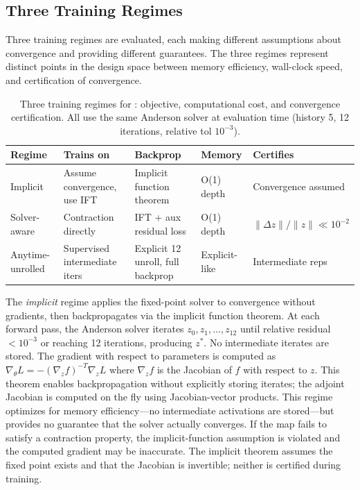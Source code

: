 \subsection*{Three Training Regimes}

Three training regimes are evaluated, each making different assumptions about convergence and providing different guarantees. The three regimes represent distinct points in the design space between memory efficiency, wall-clock speed, and certification of convergence.

\begin{table}[h]
\centering
\small
\caption{Three training regimes for \EqLM{}: objective, computational cost, and convergence certification. All use the same Anderson solver at evaluation time (history 5, 12 iterations, relative tol $10^{-3}$).}
\label{tab:regimes}
\begin{tabular}{@{}lp{2.2cm}p{2.0cm}p{1.8cm}p{2.2cm}@{}}
\toprule
Regime & Trains on & Backprop & Memory & Certifies \\
\midrule
Implicit & Assume convergence, use IFT & Implicit function theorem & O(1) depth & Convergence assumed \\
Solver-aware & Contraction directly & IFT + aux residual loss & O(1) depth & $\|\Delta z\|/\|z\| \ll 10^{-2}$ \\
Anytime-unrolled & Supervised intermediate iters & Explicit 12 unroll, full backprop & Explicit-like & Intermediate reps \\
\bottomrule
\end{tabular}
\end{table}

The \emph{implicit} regime applies the fixed-point solver to convergence without gradients, then backpropagates via the implicit function theorem. At each forward pass, the Anderson solver iterates $z_0, z_1, \ldots, z_{12}$ until relative residual $< 10^{-3}$ or reaching 12 iterations, producing $z^*$. No intermediate iterates are stored. The gradient with respect to parameters is computed as $\nabla_\theta L = -(\nabla_z f)^{-T} \nabla_z L$ where $\nabla_z f$ is the Jacobian of $f$ with respect to $z$. This theorem enables backpropagation without explicitly storing iterates; the adjoint Jacobian is computed on the fly using Jacobian-vector products. This regime optimizes for memory efficiency---no intermediate activations are stored---but provides no guarantee that the solver actually converges. If the map fails to satisfy a contraction property, the implicit-function assumption is violated and the computed gradient may be inaccurate. The implicit theorem assumes the fixed point exists and that the Jacobian is invertible; neither is certified during training.

